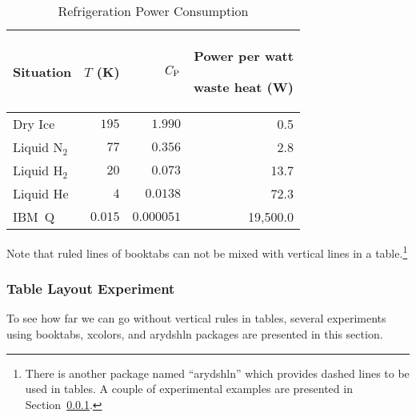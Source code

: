 \begin{table}[tbhp]
\renewcommand*{\arraystretch}{1.2}\centering\small
\begin{tabular}{lrrr}\toprule
Situation
	& $T$ (K)
		& $C_\mathrm{P}$ & \parbox[b]{.75in}{\raggedleft Power per watt\par waste heat (W)} \\
\midrule
Dry Ice
	& $195$
		& $1.990$
			& 0.5 \\
Liquid N$_2$
	& $77$
		& $0.356$
			& 2.8 \\
Liquid H$_2$
	& $20$
		& $0.073$
			& 13.7 \\
Liquid He
	& $4$
		& $0.0138$
			& 72.3 \\
IBM~Q	& $0.015$
		& $0.000051$
			& 19,500.0 \\
\bottomrule
\end{tabular}
\caption{Refrigeration Power Consumption}
\label{tab:app:styleguide:Refrigeration Power Consumption}
\end{table}

Note that ruled lines of booktabs can not be mixed with
vertical lines in a table.\footnote{
  There is another package named ``arydshln'' which provides dashed lines
  to be used in tables. A couple of experimental examples are presented in
  Section~\ref{sec:app:styleguide:Table Layout Experiment}.
}

\subsubsection{Table Layout Experiment}
\label{sec:app:styleguide:Table Layout Experiment}

To see how far we can go without vertical rules in tables,
several experiments using booktabs, xcolors, and arydshln packages
are presented in this section.

